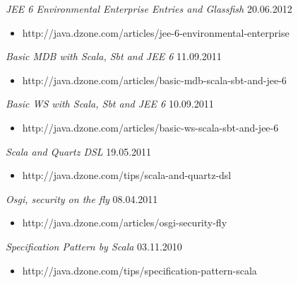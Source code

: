 \documentclass{res}
\begin{document}
\begin{resume}
{{\sl JEE 6 Environmental Enterprise Entries and Glassfish}  \hfill    20.06.2012	\\
\vspace{-5mm}  \begin{itemize}
\item[]  \scriptsize http://java.dzone.com/articles/jee-6-environmental-enterprise
\end{itemize}
\vspace{-2mm}

{\sl Basic MDB with Scala, Sbt and JEE 6}  \hfill   11.09.2011	\\
\vspace{-5mm}  \begin{itemize}
\item[]  \scriptsize http://java.dzone.com/articles/basic-mdb-scala-sbt-and-jee-6
\end{itemize}
\vspace{-2mm}

{\sl Basic WS with Scala, Sbt and JEE 6}  \hfill   10.09.2011	\\
\vspace{-5mm}  \begin{itemize}
\item[]  \scriptsize http://java.dzone.com/articles/basic-ws-scala-sbt-and-jee-6
\end{itemize}
\vspace{-2mm}

{\sl Scala and Quartz DSL}  \hfill   19.05.2011	\\
\vspace{-5mm}  \begin{itemize}
\item[]  \scriptsize http://java.dzone.com/tips/scala-and-quartz-dsl
\end{itemize}
\vspace{-2mm}

{\sl Osgi, security on the fly}  \hfill    08.04.2011	\\
\vspace{-5mm}  \begin{itemize}
\item[]  \scriptsize http://java.dzone.com/articles/osgi-security-fly
\end{itemize}
\vspace{-2mm}

{\sl Specification Pattern by Scala}  \hfill   03.11.2010	\\
\vspace{-5mm}  \begin{itemize}
\item[]  \scriptsize http://java.dzone.com/tips/specification-pattern-scala
\end{itemize}
\vspace{-2mm}

}
\end{resume}
\end{document}
